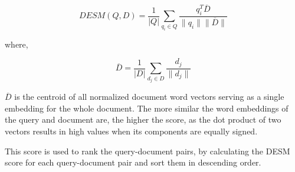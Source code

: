 \documentclass{article}
\begin{document}
$$ DESM(Q, D) = \frac{1}{|Q|} \sum_{q_i \in Q} \frac{q_i^T \overline{D}}{\|q_i\|\|\overline{D}\|} $$

where,

$$ \overline{D} = \frac{1}{|D|} \sum_{d_j \in D} \frac{d_j}{\|d_j\|} $$

$\overline{D}$ is the centroid of all normalized document word vectors serving as a single embedding for the whole document. The more similar the word embeddings of the query and document are, the higher the score, as the dot product of two vectors results in high values when its components are equally signed. 

This score is used to rank the query-document pairs, by calculating the DESM score for each query-document pair and sort them in descending order.
\end{document}
